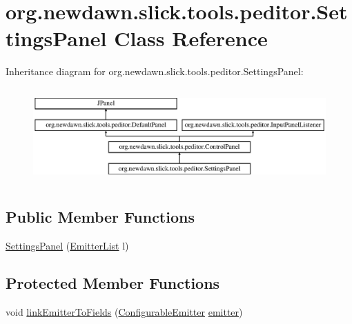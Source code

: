 \hypertarget{classorg_1_1newdawn_1_1slick_1_1tools_1_1peditor_1_1_settings_panel}{}\section{org.\+newdawn.\+slick.\+tools.\+peditor.\+Settings\+Panel Class Reference}
\label{classorg_1_1newdawn_1_1slick_1_1tools_1_1peditor_1_1_settings_panel}
Inheritance diagram for org.\+newdawn.\+slick.\+tools.\+peditor.\+Settings\+Panel\+:\begin{figure}[H]
\begin{center}
\leavevmode
\includegraphics[height=3.660131cm]{classorg_1_1newdawn_1_1slick_1_1tools_1_1peditor_1_1_settings_panel}
\end{center}
\end{figure}
\subsection*{Public Member Functions}
\begin{DoxyCompactItemize}
\item 
\mbox{\hyperlink{classorg_1_1newdawn_1_1slick_1_1tools_1_1peditor_1_1_settings_panel_a947bd9e9d1a61073529603369b8fda3b}{Settings\+Panel}} (\mbox{\hyperlink{classorg_1_1newdawn_1_1slick_1_1tools_1_1peditor_1_1_emitter_list}{Emitter\+List}} l)
\end{DoxyCompactItemize}
\subsection*{Protected Member Functions}
\begin{DoxyCompactItemize}
\item 
void \mbox{\hyperlink{classorg_1_1newdawn_1_1slick_1_1tools_1_1peditor_1_1_settings_panel_ab5e3da40629484295a5dcd9e0fc1c396}{link\+Emitter\+To\+Fields}} (\mbox{\hyperlink{classorg_1_1newdawn_1_1slick_1_1particles_1_1_configurable_emitter}{Configurable\+Emitter}} \mbox{\hyperlink{classorg_1_1newdawn_1_1slick_1_1tools_1_1peditor_1_1_control_panel_aaa170169fa574cb6b271f782afcd2517}{emitter}})
\end{DoxyCompactItemize}
